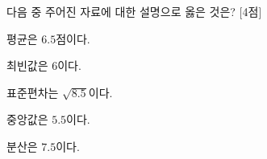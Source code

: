 다음 중 주어진 자료에 대한 설명으로 옳은 것은? \mbox{[4점]} 
\begin{choicesii}{\rule[-3ex]{0pt}{8ex}평균은 $6.5$점이다.}{\rule[-3ex]{0pt}{8ex}최빈값은 $6$이다.}{\rule[-3ex]{0pt}{8ex}표준편차는 $\sqrt{8.5}$이다.}{\rule[-3ex]{0pt}{8ex}중앙값은 $5.5$이다.}{\rule[-3ex]{0pt}{8ex}분산은 $7.5$이다.}\end{choicesii}
